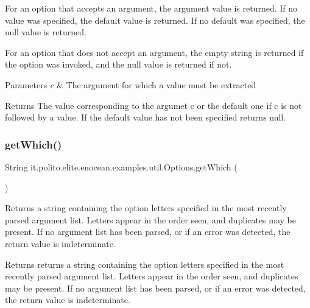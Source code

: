 For an option that accepts an argument, the argument value is returned. If no value was specified, the default value is returned. If no default was specified, the null value is returned.

For an option that does not accept an argument, the empty string is returned if the option was invoked, and the null value is returned if not. 
\begin{DoxyParams}{Parameters}
{\em c} & The argument for which a value must be extracted \\
\hline
\end{DoxyParams}
\begin{DoxyReturn}{Returns}
The value corresponding to the argumet c or the default one if c is not followed by a value. If the default value has not been specified returns null. 
\end{DoxyReturn}
\hypertarget{classit_1_1polito_1_1elite_1_1enocean_1_1examples_1_1util_1_1_options_a41ce5bb446782e4953d711dc57dc7b12}{}\label{classit_1_1polito_1_1elite_1_1enocean_1_1examples_1_1util_1_1_options_a41ce5bb446782e4953d711dc57dc7b12} 
\subsubsection{\texorpdfstring{get\+Which()}{getWhich()}}
{\footnotesize\ttfamily String it.\+polito.\+elite.\+enocean.\+examples.\+util.\+Options.\+get\+Which (\begin{DoxyParamCaption}{ }\end{DoxyParamCaption})}

Returns a string containing the option letters specified in the most recently parsed argument list. Letters appear in the order seen, and duplicates may be present. If no argument list has been parsed, or if an error was detected, the return value is indeterminate. \begin{DoxyReturn}{Returns}
returns a string containing the option letters specified in the most recently parsed argument list. Letters appear in the order seen, and duplicates may be present. If no argument list has been parsed, or if an error was detected, the return value is indeterminate. 
\end{DoxyReturn}
\hypertarget{classit_1_1polito_1_1elite_1_1enocean_1_1examples_1_1util_1_1_options_a4695dea560787146c16df39b95b712e2}{}\label{classit_1_1polito_1_1elite_1_1enocean_1_1examples_1_1util_1_1_options_a4695dea560787146c16df39b95b712e2} 
